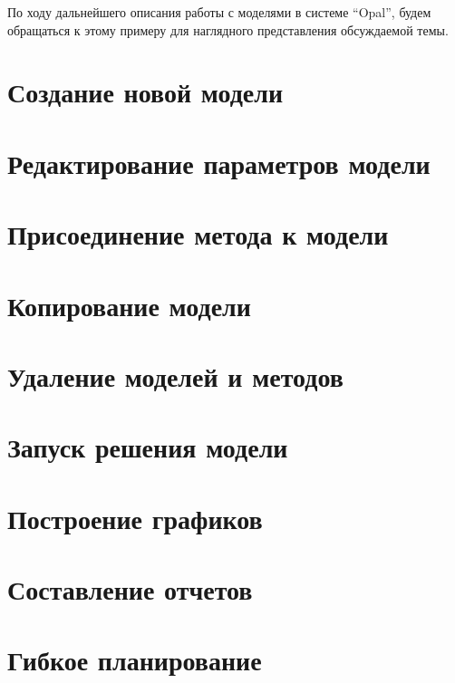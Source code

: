 По ходу дальнейшего описания работы с моделями в системе “Opal”, будем обращаться к этому примеру для наглядного представления обсуждаемой темы.

\section{Создание новой модели}

\section{Редактирование параметров модели}

\section{Присоединение метода к модели}

\section{Копирование модели}

\section{Удаление моделей и методов}

\section{Запуск решения модели}

\section{Построение графиков}

\section{Составление отчетов}

\section{Гибкое планирование}